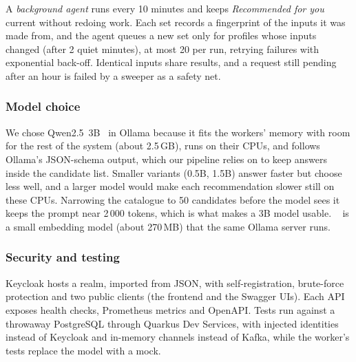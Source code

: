 A \emph{background agent} runs every 10 minutes and keeps \emph{Recommended for you} current without redoing work. Each set records a fingerprint of the inputs it was made from, and the agent queues a new set only for profiles whose inputs changed (after 2 quiet minutes), at most 20 per run, retrying failures with exponential back-off. Identical inputs share results, and a request still pending after an hour is failed by a sweeper as a safety net.

\subsubsection{Model choice} We chose Qwen2.5~3B~\cite{qwen25} in Ollama because it fits the workers' memory with room for the rest of the system (about 2.5\,GB), runs on their CPUs, and follows Ollama's JSON-schema output, which our pipeline relies on to keep answers inside the candidate list. Smaller variants (0.5B, 1.5B) answer faster but choose less well, and a larger model would make each recommendation slower still on these CPUs. Narrowing the catalogue to 50 candidates before the model sees it keeps the prompt near 2\,000 tokens, which is what makes a 3B model usable. ~\cite{nomic-embed} is a small embedding model (about 270\,MB) that the same Ollama server runs.

\subsubsection{Security and testing} Keycloak hosts a  realm, imported from JSON, with self-registration, brute-force protection and two public clients (the frontend and the Swagger UIs). Each API exposes health checks, Prometheus metrics and OpenAPI. Tests run against a throwaway PostgreSQL through Quarkus Dev Services, with injected identities instead of Keycloak and in-memory channels instead of Kafka, while the worker's tests replace the model with a mock.
